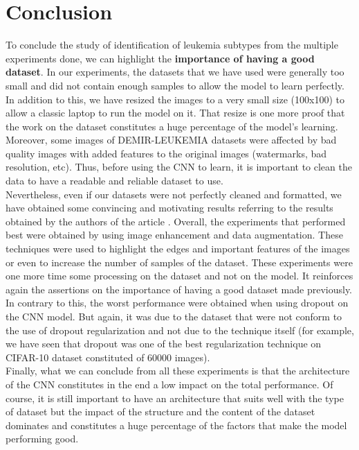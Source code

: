 \documentclass[11pt, openany]{report}
\theoremstyle{plain}
\theoremstyle{definition}
\theoremstyle{remark}
\begin{document}
\newpage
\section{Conclusion}

To conclude the study of identification of leukemia subtypes from the multiple experiments done, we can highlight the \textbf{importance of having a good dataset}. In our experiments, the datasets that we have used were generally too small and did not contain enough samples to allow the model to learn perfectly. In addition to this, we have resized the images to a very small size (100x100) to allow a classic laptop to run the model on it. That resize is one more proof that the work on the dataset constitutes a huge percentage of the model's learning. Moreover, some images of DEMIR-LEUKEMIA datasets were affected by bad quality images with added features to the original images (watermarks, bad resolution, etc). Thus, before using the CNN to learn, it is important to clean the data to have a readable and reliable dataset to use.\\

Nevertheless, even if our datasets were not perfectly cleaned and formatted, we have obtained some convincing and motivating results referring to the results obtained by the authors of the article \cite{leukemia}. Overall, the experiments that performed best were obtained by using image enhancement and data augmentation. These techniques were used to highlight the edges and important features of the images or even to increase the number of samples of the dataset. These experiments were one more time some processing on the dataset and not on the model. It reinforces again the assertions on the importance of having a good dataset made previously. In contrary to this, the worst performance were obtained when using dropout on the CNN model. But again, it was due to the dataset that were not conform to the use of dropout regularization and not due to the technique itself (for example, we have seen that dropout was one of the best regularization technique on CIFAR-10 dataset constituted of 60000 images). \\ 

Finally, what we can conclude from all these experiments is that the architecture of the CNN constitutes in the end a low impact on the total performance. Of course, it is still important to have an architecture that suits well with the type of dataset but the impact of the structure and the content of the dataset dominates and constitutes a huge percentage of the factors that make the model performing good.  \\
\end{document}
